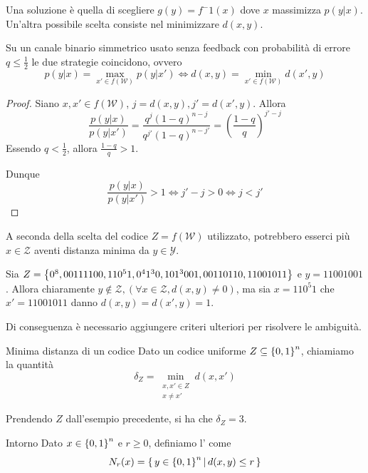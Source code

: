 Una soluzione  è quella di scegliere \(g(y) = f^-1(x)\) dove \(x\) massimizza \(p(y|x)\).
Un'altra possibile scelta consiste nel minimizzare \(d(x,y)\).

\begin{proposition}{}
  Su un canale binario simmetrico usato senza feedback con probabilità di errore \(q \leq \frac{1}{2}\) le due strategie coincidono, ovvero
  \[p(y|x) = \max_{x' \in f(\mathcal{W})} p(y|x') \iff d(x,y) = \min_{x' \in f(\mathcal{W})} d(x',y)\]
\end{proposition}

\begin{proof}{}
  Siano \(x,x' \in f(\mathcal{W})\), \(j=d(x,y), j'=d(x',y)\). Allora
  \[\frac{p(y|x)}{p(y|x')} = \frac{q^j{(1-q)}^{n-j}}{q^{j'}{(1-q)}^{n-j'}} = {\left(\frac{1-q}{q}\right)}^{j'-j}\]
  Essendo \(q < \frac{1}{2}\), allora \(\frac{1-q}{q} > 1\).

  Dunque \[\frac{p(y|x)}{p(y|x')} > 1 \iff j' - j > 0 \iff j < j'\]
\end{proof}

\begin{observation}{}
  A seconda della scelta del codice \(Z = f(\mathcal{W})\) utilizzato, potrebbero esserci più \(x \in \mathcal{Z}\) aventi distanza minima da \(y \in \mathcal{Y}\).
  \begin{example}{}
    Sia \(Z = \set{0^8,00111100,11 0^5 1,0^4 1^3 0,101^3 001,00110110,11001011}\) e \(y = 11001001\). Allora chiaramente \(y \not\in \mathcal{Z}, (\forall x \in \mathcal{Z}, d(x,y)\neq 0)\), ma sia \(x=110^5 1\) che \(x' = 11001011\) danno \(d(x,y)=d(x',y) = 1\).
  \end{example}

  Di conseguenza è necessario aggiungere criteri ulteriori per risolvere le ambiguità.
\end{observation}

\begin{definition}{Minima distanza di un codice}
  Dato un codice uniforme \(Z\subseteq \set{0,1}^n\), chiamiamo  la  quantità
  \[\delta_Z = \min_{\substack{x,x' \in Z \\ x\neq x'}} d(x,x')\]
\end{definition}

\begin{example}{}
  Prendendo \(Z\) dall'esempio precedente, si ha che \(\delta_Z = 3\).
\end{example}

\begin{definition}{Intorno}
  Dato \(x \in \set{0,1}^n\) e \(r \geq 0\), definiamo l' come
  \[N_r(x) = \set{y \in \set{0,1}^n }[ d(x,y) \leq r]\]
\end{definition}

